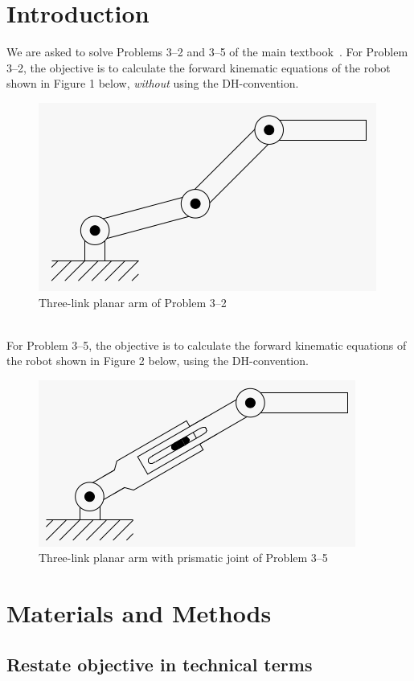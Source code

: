 \documentclass[conference]{IEEEtran}
\begin{document}
\section{Introduction}
We are asked to solve Problems 3--2 and 3--5 of the main textbook~\cite{Spong2006}.
For Problem 3--2, the objective is to calculate the forward kinematic equations
of the robot shown in Figure 1 below, \textit{without} using the DH-convention.\\
\begin{figure}[h]
    \includegraphics[scale=0.4]{prob3_2.png}
    \centering
    \caption{Three-link planar arm of Problem 3--2}
\end{figure}\\
For Problem 3--5, the objective is to calculate the forward kinematic equations
of the robot shown in Figure 2 below, using the DH-convention.
\begin{figure}[h]
    \includegraphics[scale=0.4]{prob3_5.png}
    \centering
    \caption{Three-link planar arm with prismatic joint of Problem 3--5}
\end{figure}

\section{Materials and Methods}

\subsection{Restate objective in technical terms}
\end{document}
